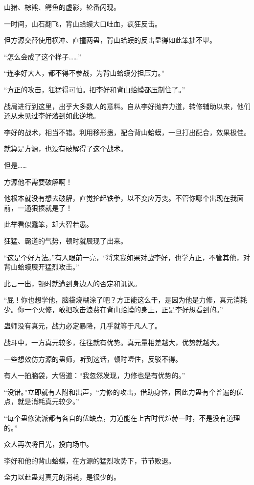 \begin{this_body}
山猪、棕熊、鳄鱼的虚影，轮番闪现。

一时间，山石翻飞，背山蛤蟆大口吐血，疯狂反击。

但方源交替使用横冲、直撞两蛊，背山蛤蟆的反击显得如此笨拙不堪。

“怎么会成了这个样子……”

“连李好大人，都不得不参战，为背山蛤蟆分担压力。”

“方正的攻击，狂猛得可怕。把李好和背山蛤蟆都压制住了。”

战局进行到这里，出乎大多数人的意料。自从李好抛弃力道，转修辅助以来，他们还从未见过李好落到如此逆境。

李好的战术，相当不错。利用移形蛊，配合背山蛤蟆，一旦打出配合，效果极佳。

就算是方源，也没有破解得了这个战术。

但是……

方源他不需要破解啊！

他根本就没有想去破解，直觉抡起铁拳，以不变应万变。不管你哪个出现在我面前，一通狠揍就是了！

此举看似蠢笨，却大智若愚。

狂猛、霸道的气势，顿时就展现了出来。

“这是个好方法。”有人眼前一亮，“将来我如果对战李好，也学方正，不管其他，对背山蛤蟆展开猛烈攻击。”

此言一出，顿时就遭到身边人的否定和讥讽。

“屁！你也想学他，脑袋烧糊涂了吧？方正能这么干，是因为他是力修，真元消耗少。你一个火修，敢把攻击浪费在背山蛤蟆的身上，正是李好想看到的。”

蛊师没有真元，战力必定暴降，几乎就等于凡人了。

战斗中，一方真元较多，往往就有优势。真元量相差越大，优势就越大。

一些想效仿方源的蛊师，听到这话，顿时噎住，反驳不得。

有人一拍脑袋，大悟道：“我忽然发现，力修也是有优势的。”

“没错。”立即就有人附和出声，“力修的攻击，借助身体，因此力蛊有个普遍的优点，就是消耗真元较少。”

“每个蛊修流派都有各自的优缺点，力道能在上古时代煊赫一时，不是没有道理的。”

众人再次将目光，投向场中。

李好和他的背山蛤蟆，在方源的猛烈攻势下，节节败退。

全力以赴蛊对真元的消耗，是很少的。


\end{this_body}
